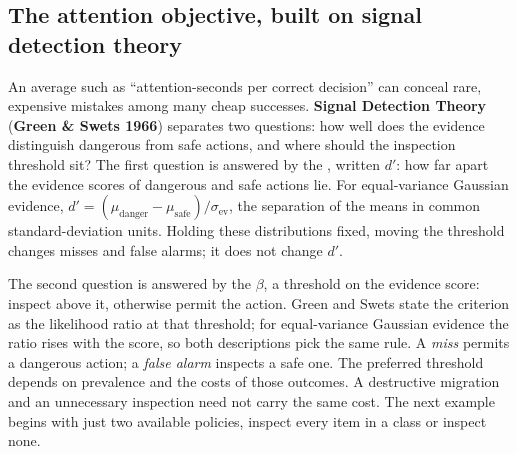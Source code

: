 \documentclass[11pt,a4paper]{article}
\theoremstyle{definition}
\theoremstyle{plain}
\begin{document}
\subsection{The attention objective, built on signal detection theory}\label{sec:sdt}

An average such as ``attention-seconds per correct decision'' can conceal rare,
expensive mistakes among many cheap successes. \textbf{Signal Detection Theory}
(\textbf{Green \& Swets 1966}) separates two questions:
how well does the evidence distinguish dangerous from safe actions, and where
should the inspection threshold sit? The first question is answered by the
, written $d'$: how far apart the evidence scores of
dangerous and safe actions lie. For equal-variance Gaussian evidence,
$d'=(\mu_{\mathrm{danger}}-\mu_{\mathrm{safe}})/\sigma_{\mathrm{ev}}$, the
separation of the means in common standard-deviation units. Holding these
distributions fixed, moving the threshold changes misses and false alarms;
it does not change $d'$.

The second question is answered by the  $\beta$, a threshold
on the evidence score: inspect above it, otherwise permit the action. Green and
Swets state the criterion as the likelihood ratio at that threshold; for
equal-variance Gaussian evidence the ratio rises with the score, so both
descriptions pick the same rule. A \emph{miss} permits a dangerous action; a \emph{false alarm}
inspects a safe one. The preferred threshold depends on prevalence and the costs
of those outcomes. A destructive migration and an unnecessary inspection need
not carry the same cost. The next example begins with just two available
policies, inspect every item in a class or inspect none.
\end{document}
